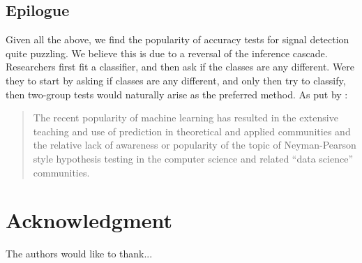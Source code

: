 \documentclass[journal]{IEEEtran}
\begin{document}
\subsection{Epilogue}
Given all the above, we find the popularity of accuracy tests for signal detection quite puzzling. 
We believe this is due to a reversal of the inference cascade. 
Researchers first fit a classifier, and then ask if the classes are any different.
Were they to start by asking if classes are any different, and only then try to classify, then two-group tests would naturally arise as the preferred method. 
As put by \cite{ramdas_classification_2016}:
\begin{quote}
	The recent popularity of machine learning has resulted in the extensive teaching and use
	of prediction in theoretical and applied communities and the relative lack of awareness or
	popularity of the topic of Neyman-Pearson style hypothesis testing in the computer science
	and related ``data science'' communities.
\end{quote}




\section*{Acknowledgment}


The authors would like to thank...


\ifCLASSOPTIONcaptionsoff
  \newpage
\fi






%

%
%
\end{document}
